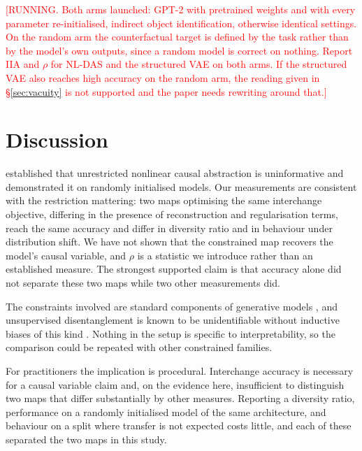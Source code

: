 \documentclass[11pt]{article}
\newcommand{\TODO}[1]{\textcolor{red}{[#1]}}
\begin{document}
\TODO{RUNNING. Both arms launched: GPT-2 with pretrained weights and with every
parameter re-initialised, indirect object identification, otherwise identical
settings. On the random arm the counterfactual target is defined by the task
rather than by the model's own outputs, since a random model is correct on
nothing. Report IIA and $\rho$ for NL-DAS and the structured VAE on both arms. If
the structured VAE also reaches high accuracy on the random arm, the reading
given in \S\ref{sec:vacuity} is not supported and the paper needs rewriting
around that.}

\section{Discussion}
\label{sec:discussion}

\citet{sutter2025nonlinear} established that unrestricted nonlinear causal
abstraction is uninformative and demonstrated it on randomly initialised models.
Our measurements are consistent with the restriction mattering: two maps
optimising the same interchange objective, differing in the presence of
reconstruction and regularisation terms, reach the same accuracy and differ in
diversity ratio and in behaviour under distribution shift. We have not shown that
the constrained map recovers the model's causal variable, and $\rho$ is a
statistic we introduce rather than an established measure. The strongest
supported claim is that accuracy alone did not separate these two maps while two
other measurements did.

The constraints involved are standard components of generative models
\citep{khemakhem2020variational, narayanaswamy2017learning}, and unsupervised
disentanglement is known to be unidentifiable without inductive biases of this
kind \citep{locatello2019challenging}. Nothing in the setup is specific to
interpretability, so the comparison could be repeated with other constrained
families.

For practitioners the implication is procedural. Interchange accuracy is
necessary for a causal variable claim and, on the evidence here, insufficient to
distinguish two maps that differ substantially by other measures. Reporting a
diversity ratio, performance on a randomly initialised model of the same
architecture, and behaviour on a split where transfer is not expected costs
little, and each of these separated the two maps in this study.
\end{document}
